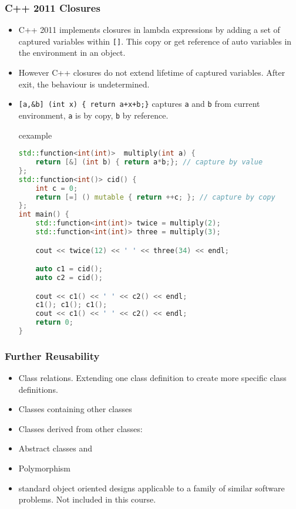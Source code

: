 \begin{frame}[fragile]
\frametitle{C++ 2011 Closures}
\scriptsize
\begin{itemize}
\item C++ 2011 implements closures in lambda expressions by adding a set of captured variables within \lstinline![]!. This copy or get reference of auto variables in the environment in an object.
\item However C++ closures do not extend lifetime of captured variables. After exit, the behaviour is undetermined. 
\item \lstinline![a,&b] (int x) { return a+x+b;}! captures \lstinline!a! and \lstinline!b! from current environment, \lstinline!a! is by copy, \lstinline!b! by reference.\\[.5em]
\begin{beamercolorbox}{cexample}
\begin{lstlisting}[language=C++, basicstyle=\tiny\tt]
std::function<int(int)>  multiply(int a) {
    return [&] (int b) { return a*b;}; // capture by value
};
std::function<int()> cid() {
    int c = 0;
    return [=] () mutable { return ++c; }; // capture by copy
};
int main() {
    std::function<int(int)> twice = multiply(2);
    std::function<int(int)> three = multiply(3);

    cout << twice(12) << ' ' << three(34) << endl;

    auto c1 = cid();
    auto c2 = cid();

    cout << c1() << ' ' << c2() << endl;
    c1(); c1(); c1();
    cout << c1() << ' ' << c2() << endl;
    return 0;
}
\end{lstlisting}
\end{beamercolorbox}
\end{itemize}
\end{frame}

\begin{frame}[fragile]
\frametitle{Further Reusability}
\begin{itemize}
\item Class relations. Extending one class definition to create 
more specific class definitions.
\item Classes containing other classes
\item Classes derived from other classes: 
\item Abstract classes and 
\item Polymorphism
\item {} standard object oriented designs applicable to a
	family of similar software problems. Not included in this course.
\end{itemize}
\end{frame}



